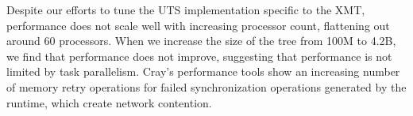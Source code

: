Despite our efforts to tune the UTS implementation specific to the 
XMT, performance does not scale well with increasing processor count,
flattening out around 60 processors.  When we increase the size of
the tree from 100M to 4.2B, we find that performance does not improve,
suggesting that performance is not limited by task parallelism.
Cray's performance tools show an increasing number of memory
retry operations for failed synchronization operations generated by
the runtime, which create network contention.


